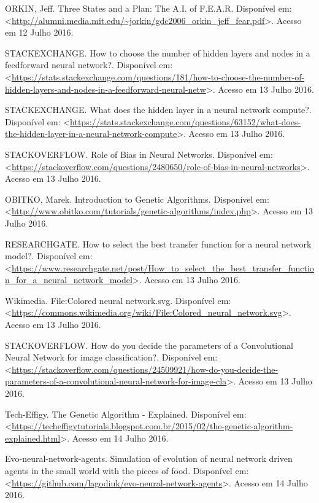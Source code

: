 \documentclass[12pt,a4paper]{article}
\begin{document}
	ORKIN, Jeff. Three States and a Plan: The A.I. of F.E.A.R. Disponível em: \textless \url{http://alumni.media.mit.edu/~jorkin/gdc2006_orkin_jeff_fear.pdf}\textgreater. Acesso em 12 Julho 2016.\par
	\sloppy STACKEXCHANGE. How to choose the number of hidden layers and nodes in a feedforward neural network?. Disponível em: \textless \url{https://stats.stackexchange.com/questions/181/how-to-choose-the-number-of-hidden-layers-and-nodes-in-a-feedforward-neural-netw}\textgreater. Acesso em 13 Julho 2016.\par
	STACKEXCHANGE. What does the hidden layer in a neural network compute?. Disponível em: \textless \url{https://stats.stackexchange.com/questions/63152/what-does-the-hidden-layer-in-a-neural-network-compute}\textgreater. Acesso em 13 Julho 2016.\par
	STACKOVERFLOW. Role of Bias in Neural Networks. Disponível em: \textless \url{https://stackoverflow.com/questions/2480650/role-of-bias-in-neural-networks}\textgreater. Acesso em 13 Julho 2016.\par
	OBITKO, Marek. Introduction to Genetic Algorithms. Disponível em: \textless \url{http://www.obitko.com/tutorials/genetic-algorithms/index.php}\textgreater. Acesso em 13 Julho 2016.\par
	RESEARCHGATE. How to select the best transfer function for a neural network model?. Disponível em: \textless \url{https://www.researchgate.net/post/How_to_select_the_best_transfer_function_for_a_neural_network_model}\textgreater. Acesso em 13 Julho 2016.\par
	Wikimedia. File:Colored neural network.svg. Disponível em: \textless \url{https://commons.wikimedia.org/wiki/File:Colored_neural_network.svg}\textgreater. Acesso em 13 Julho 2016.\par
	STACKOVERFLOW. How do you decide the parameters of a Convolutional Neural Network for image classification?. Disponível em: \textless \url{https://stackoverflow.com/questions/24509921/how-do-you-decide-the-parameters-of-a-convolutional-neural-network-for-image-cla}\textgreater. Acesso em 13 Julho 2016.\par
	Tech-Effigy. The Genetic Algorithm - Explained. Disponível em: \textless \url{https://techeffigytutorials.blogspot.com.br/2015/02/the-genetic-algorithm-explained.html}\textgreater. Acesso em 14 Julho 2016.\par
	Evo-neural-network-agents. Simulation of evolution of neural network driven agents in the small world with the pieces of food. Disponível em: \textless \url{https://github.com/lagodiuk/evo-neural-network-agents}\textgreater. Acesso em 14 Julho 2016.\par
\end{document}
